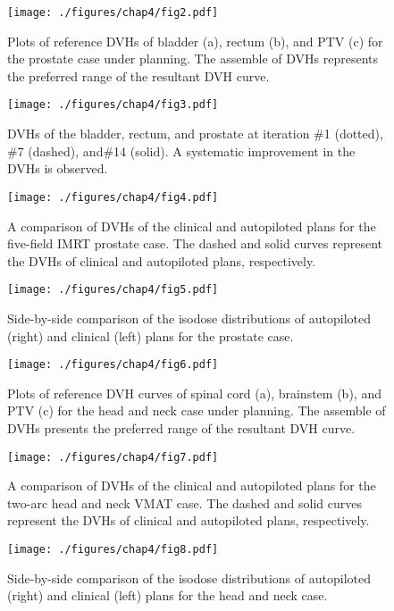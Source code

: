 \documentclass{article}
\begin{document}
        
\begin{figure}[h!]
	\centering
	\texttt{[image: ./figures/chap4/fig2.pdf]}
	\caption{Plots of reference DVHs of  bladder (a), rectum (b), and PTV (c) for the prostate case under planning. The assemble of DVHs represents the preferred range of the resultant DVH curve. 
	\label{fig4.2}}
    \end{figure}

\begin{figure}[h!]
	\centering
	\texttt{[image: ./figures/chap4/fig3.pdf]}
	\caption{DVHs of the bladder, rectum, and prostate at iteration \#1 (dotted), \#7 (dashed), and\#14 (solid).  A systematic improvement in the DVHs is observed. 
	\label{fig4.3}}
    \end{figure}

\begin{figure}[h!]
	\centering
	\texttt{[image: ./figures/chap4/fig4.pdf]}
	\caption{A comparison of DVHs of the clinical and autopiloted plans for the five-field IMRT prostate case. The dashed and solid curves represent the DVHs of clinical and autopiloted plans, respectively. 
	\label{fig4.4}}
    \end{figure}

\begin{figure}[h!]
	\centering
	\texttt{[image: ./figures/chap4/fig5.pdf]}
	\caption{Side-by-side comparison of the isodose distributions of autopiloted (right) and clinical (left) plans for the prostate case. 
	\label{fig4.5}}
    \end{figure}

\begin{figure}[h!]
	\centering
	\texttt{[image: ./figures/chap4/fig6.pdf]}
	\caption{Plots of reference DVH curves of spinal cord (a), brainstem (b), and PTV (c) for the head and neck case under planning. The assemble of DVHs presents the preferred range of the resultant DVH curve. 
	\label{fig4.6}}
    \end{figure}
   
\begin{figure}[h!]
	\centering
	\texttt{[image: ./figures/chap4/fig7.pdf]}
	\caption{A comparison of DVHs of the clinical and autopiloted plans for the two-arc head and neck VMAT case. The dashed and solid curves represent the DVHs of clinical and autopiloted plans, respectively. 
	\label{fig4.7}}
    \end{figure}
    
\begin{figure}[h!]
	\centering
	\texttt{[image: ./figures/chap4/fig8.pdf]}
	\caption{Side-by-side comparison of the isodose distributions of autopiloted (right) and clinical (left) plans for the head and neck case. 
	\label{fig4.8}}
    \end{figure}
     
\end{document}
